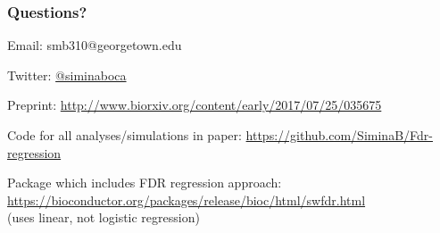 \documentclass{beamer}
\begin{document}
\begin{frame}
\frametitle{Questions?}

Email: smb310@georgetown.edu \\ \vspace{0.2cm}

Twitter: \href{https://twitter.com/siminaboca}{@siminaboca} \\ \vspace{0.2cm}

Preprint: \url{http://www.biorxiv.org/content/early/2017/07/25/035675} \\ \vspace{0.2cm}

Code for all analyses/simulations in paper: \url{https://github.com/SiminaB/Fdr-regression} \\ \vspace{0.2cm}

Package which includes FDR regression approach: \url{https://bioconductor.org/packages/release/bioc/html/swfdr.html}\\
(uses linear, not logistic regression)

\end{frame}
\end{document}
